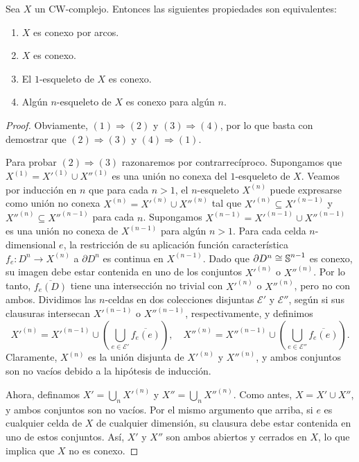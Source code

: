 \begin{teorema}
	\label{teo:cw-conexion}
	Sea $X$ un CW-complejo. Entonces las siguientes propiedades son equivalentes:
	\begin{enumerate}
		\item $X$ es conexo por arcos.
		
		\item $X$ es conexo.
		
		\item El $1$-esqueleto de $X$ es conexo.
		
		\item Algún $n$-esqueleto de $X$ es conexo para algún $n$.
	\end{enumerate}
\end{teorema}
\begin{proof}
	Obviamente, $(1) \Rightarrow (2)$ y $(3) \Rightarrow (4)$, por lo que basta con
	demostrar que $(2) \Rightarrow (3)$ y $(4) \Rightarrow (1)$.
	
	Para probar $(2) \Rightarrow (3)$ razonaremos por contrarrecíproco. Supongamos
	que $X^{(1)}= X'^{(1)}\cup X''^{(1)}$ es una unión no conexa del $1$-esqueleto
	de $X$. Veamos por inducción en $n$ que para cada $n > 1$, el $n$-esqueleto
	$X^{(n)}$ puede expresarse como unión no conexa
	$X^{(n)}= X'^{(n)}\cup X''^{(n)}$ tal que $X'^{(n)}\subseteq X'^{(n-1)}$ y
	$X''^{(n)}\subseteq X''^{(n-1)}$ para cada $n$. Supongamos $X^{(n-1)}= X'^{(n-1)}
	\cup X''^{(n-1)}$ es una unión no conexa de $X^{(n-1)}$ para algún $n > 1$.
	Para cada celda $n$-dimensional $e$, la restricción de su aplicación función característica
	$f_{e} \colon D^{n} \to X^{(n)}$ a $\partial D^{n}$ es continua en $X^{(n-1)}$.
	Dado que $\partial D^{n} \cong \operatorname{\mathbb{S}}^{n-1}$ es conexo, su imagen debe estar contenida
	en uno de los conjuntos $X'^{(n)}$ o $X''^{(n)}$. Por lo tanto, $\overline{f_e(D)}$
	tiene una intersección no trivial con $X'^{(n)}$ o $X''^{(n)}$, pero no con
	ambos. Dividimos las $n$-celdas en dos colecciones disjuntas $\mathcal{E}'$ y $\mathcal{E}
	''$, según si sus clausuras intersecan $X'^{(n-1)}$ o $X''^{(n-1)}$, respectivamente,
	y definimos
	\[
	X'^{(n)}= X'^{(n-1)}\cup \left(\bigcup_{e \in \mathcal{E}'}\overline{f_e(e)}\right
	),\quad X''^{(n)}= X''^{(n-1)}\cup \left(\bigcup_{e \in \mathcal{E}''}\overline
	{f_e(e)}\right).
	\]
	Claramente, $X^{(n)}$ es la unión disjunta de $X'^{(n)}$ y $X''^{(n)}$, y
	ambos conjuntos son no vacíos debido a la hipótesis de inducción.
	
	Ahora, definamos $X' = \bigcup_{n} X'^{(n)}$ y $X'' = \bigcup_{n} X''^{(n)}$.
	Como antes, $X = X' \cup X''$, y ambos conjuntos son no vacíos. Por el mismo argumento
	que arriba, si $e$ es cualquier celda de $X$ de cualquier dimensión, su clausura
	debe estar contenida en uno de estos conjuntos. Así, $X'$ y $X''$ son ambos abiertos
	y cerrados en $X$, lo que implica que $X$ no es conexo.
	

\end{proof}
